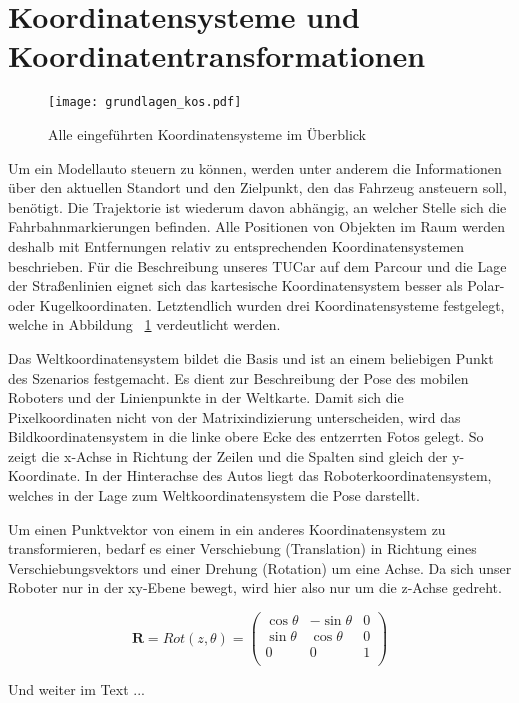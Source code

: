 \section{Koordinatensysteme und Koordinatentransformationen}

\begin{figure}[htb] %
  \centering
  \texttt{[image: grundlagen\_kos.pdf]}
  \caption{Alle eingeführten Koordinatensysteme im Überblick}
  \label{fig:grundlagen_kos}
\end{figure}

Um ein Modellauto steuern zu können, werden unter anderem die Informationen über den aktuellen Standort und den Zielpunkt, den das Fahrzeug ansteuern soll, benötigt. Die Trajektorie ist wiederum davon abhängig, an welcher Stelle sich die Fahrbahnmarkierungen befinden. Alle Positionen von Objekten im Raum werden deshalb mit Entfernungen relativ zu entsprechenden Koordinatensystemen beschrieben. Für die Beschreibung unseres TUCar auf dem Parcour und die Lage der Straßenlinien eignet sich das kartesische Koordinatensystem besser als Polar- oder Kugelkoordinaten. Letztendlich wurden drei Koordinatensysteme festgelegt, welche in Abbildung ~\ref{fig:grundlagen_kos} verdeutlicht werden. 

Das Weltkoordinatensystem bildet die Basis und ist an einem beliebigen Punkt des Szenarios festgemacht. Es dient zur Beschreibung der Pose des mobilen Roboters und der Linienpunkte in der Weltkarte. Damit sich die Pixelkoordinaten nicht von der Matrixindizierung unterscheiden, wird das Bildkoordinatensystem in die linke obere Ecke des entzerrten Fotos gelegt. So zeigt die x-Achse in Richtung der Zeilen und die Spalten sind gleich der y-Koordinate. In der Hinterachse des Autos liegt das Roboterkoordinatensystem, welches in der Lage zum Weltkoordinatensystem die Pose darstellt.

Um einen Punktvektor von einem in ein anderes Koordinatensystem zu transformieren, bedarf es einer Verschiebung (Translation) in Richtung eines Verschiebungsvektors und einer Drehung (Rotation) um eine Achse. Da sich unser Roboter nur in der xy-Ebene bewegt, wird hier also nur um die z-Achse gedreht.  

\begin{equation}
\mathbf{R} = Rot(z,\theta) = 
\begin{pmatrix}
\cos{\theta} & -\sin{\theta} & {0} 	\\
\sin{\theta} & \cos{\theta} & {0} 	\\
{0} & {0} & {1} 				    	\\
\end{pmatrix}
\end{equation}

Und weiter im Text ...
